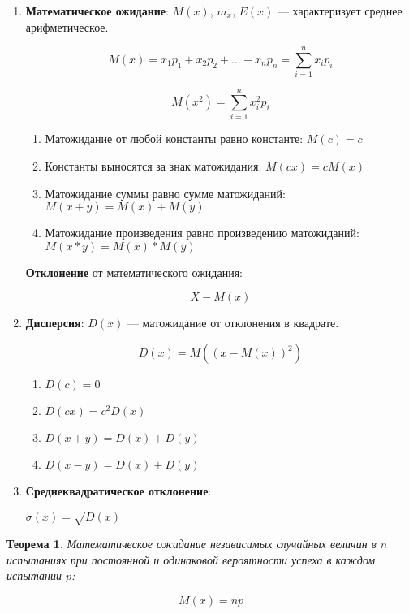\documentclass{article}
\newtheorem{theorem}{Теорема}
\begin{document}
\begin{enumerate}
    \item \textbf{Математическое ожидание}: $M(x)$, $m_x$, $E(x)$ — характеризует среднее арифметическое.
    
    $$M(x) = x_1p_1 + x_2 p_2 + \dots + x_{n} p_{n} = \sum\limits_{i = 1}^{n} x_{i} p_{i}$$

    $$M(x^2) = \sum\limits_{i = 1}^{n} x_{i}^2 p_{i}$$

    \begin{enumerate}
        \item Матожидание от любой константы равно константе: $M(c) = c$
        \item Константы выносятся за знак матожидания: $M(cx) = c M(x)$
        \item Матожидание суммы равно сумме матожиданий: $M(x + y) = M(x) + M(y)$
        \item Матожидание произведения равно произведению матожиданий: $M(x * y) = M(x) * M(y)$
    \end{enumerate}

    \textbf{Отклонение} от математического ожидания:

    $$X - M(x)$$
    \item \textbf{Дисперсия}: $D(x)$ — матожидание от отклонения в квадрате.
    
    $$D(x) = M((x - M(x))^2)$$

    \begin{multicols}{2}
    \begin{enumerate}
        \item $D(c) = 0$
        \item $D(cx) = c^2 D(x)$
        \item $D(x + y) = D(x) + D(y)$
        \item $D(x - y) = D(x) + D(y)$
    \end{enumerate}
    \end{multicols}
    \item \textbf{Среднеквадратическое отклонение}:
    
    $\sigma(x) = \sqrt{D(x)}$
\end{enumerate}

\begin{theorem}
    Математическое ожидание независимых случайных величин в $n$ испытаниях при постоянной и одинаковой вероятности успеха в каждом испытании $p$:

    $$M(x) = np$$
\end{theorem}
\end{document}
